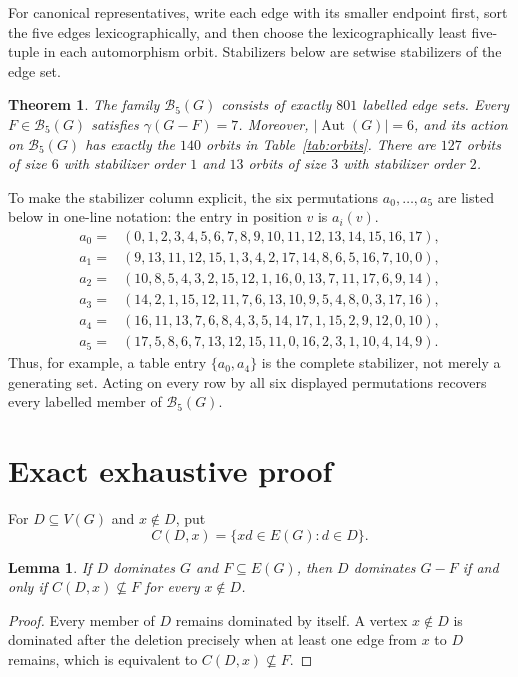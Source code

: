 \documentclass[10pt]{article}
\newtheorem{theorem}{Theorem}
\newtheorem{lemma}{Lemma}
\newcommand{\Bfive}{\mathcal B_5(G)}
\newcommand{\Aut}{\operatorname{Aut}}
\begin{document}
For canonical representatives, write each edge with its smaller endpoint
first, sort the five edges lexicographically, and then choose the
lexicographically least five-tuple in each automorphism orbit.  Stabilizers
below are setwise stabilizers of the edge set.

\begin{theorem}\label{thm:classification}
The family $\Bfive$ consists of exactly $801$ labelled edge sets.  Every
$F\in\Bfive$ satisfies $\gamma(G-F)=7$.  Moreover, $|\Aut(G)|=6$, and its
action on $\Bfive$ has exactly the $140$ orbits in Table~\ref{tab:orbits}.
There are $127$ orbits of size $6$ with stabilizer order $1$ and $13$ orbits
of size $3$ with stabilizer order $2$.
\end{theorem}

To make the stabilizer column explicit, the six permutations $a_0,\ldots,a_5$
are listed below in one-line notation: the entry in position $v$ is $a_i(v)$.
\begin{align*}
a_0={}&(0,1,2,3,4,5,6,7,8,9,10,11,12,13,14,15,16,17),\\
a_1={}&(9,13,11,12,15,1,3,4,2,17,14,8,6,5,16,7,10,0),\\
a_2={}&(10,8,5,4,3,2,15,12,1,16,0,13,7,11,17,6,9,14),\\
a_3={}&(14,2,1,15,12,11,7,6,13,10,9,5,4,8,0,3,17,16),\\
a_4={}&(16,11,13,7,6,8,4,3,5,14,17,1,15,2,9,12,0,10),\\
a_5={}&(17,5,8,6,7,13,12,15,11,0,16,2,3,1,10,4,14,9).
\end{align*}
Thus, for example, a table entry $\{a_0,a_4\}$ is the complete stabilizer,
not merely a generating set.  Acting on every row by all six displayed
permutations recovers every labelled member of $\Bfive$.

\section{Exact exhaustive proof}

For $D\subseteq V(G)$ and $x\notin D$, put
\[
 C(D,x)=\{xd\in E(G):d\in D\}.
\]

\begin{lemma}\label{lem:bundle}
If $D$ dominates $G$ and $F\subseteq E(G)$, then $D$ dominates $G-F$ if and
only if $C(D,x)\nsubseteq F$ for every $x\notin D$.
\end{lemma}

\begin{proof}
Every member of $D$ remains dominated by itself.  A vertex $x\notin D$ is
dominated after the deletion precisely when at least one edge from $x$ to
$D$ remains, which is equivalent to $C(D,x)\nsubseteq F$.
\end{proof}
\end{document}
